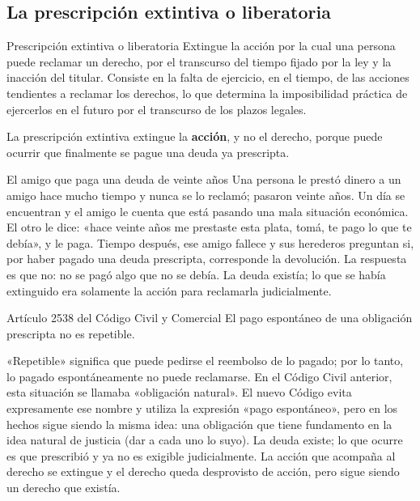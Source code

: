 \documentclass[12pt,oneside]{book}
\begin{document}
\subsection{La prescripción extintiva o liberatoria}

\begin{definition}{Prescripción extintiva o liberatoria}
Extingue la acción por la cual una persona puede reclamar un derecho, por el transcurso del tiempo fijado por la ley y la inacción del titular. Consiste en la falta de ejercicio, en el tiempo, de las acciones tendientes a reclamar los derechos, lo que determina la imposibilidad práctica de ejercerlos en el futuro por el transcurso de los plazos legales.
\end{definition}

\begin{important}
La prescripción extintiva extingue la \textbf{acción}, y no el derecho, porque puede ocurrir que finalmente se pague una deuda ya prescripta.
\end{important}

\begin{example}{El amigo que paga una deuda de veinte años}
Una persona le prestó dinero a un amigo hace mucho tiempo y nunca se lo reclamó; pasaron veinte años. Un día se encuentran y el amigo le cuenta que está pasando una mala situación económica. El otro le dice: «hace veinte años me prestaste esta plata, tomá, te pago lo que te debía», y le paga. Tiempo después, ese amigo fallece y sus herederos preguntan si, por haber pagado una deuda prescripta, corresponde la devolución. La respuesta es que no: no se pagó algo que no se debía. La deuda existía; lo que se había extinguido era solamente la acción para reclamarla judicialmente.
\end{example}

\begin{articulo}{Artículo 2538 del Código Civil y Comercial}
El pago espontáneo de una obligación prescripta no es repetible.
\end{articulo}

«Repetible» significa que puede pedirse el reembolso de lo pagado; por lo tanto, lo pagado espontáneamente no puede reclamarse. En el Código Civil anterior, esta situación se llamaba «obligación natural». El nuevo Código evita expresamente ese nombre y utiliza la expresión «pago espontáneo», pero en los hechos sigue siendo la misma idea: una obligación que tiene fundamento en la idea natural de justicia (dar a cada uno lo suyo). La deuda existe; lo que ocurre es que prescribió y ya no es exigible judicialmente. La acción que acompaña al derecho se extingue y el derecho queda desprovisto de acción, pero sigue siendo un derecho que existía.
\end{document}
